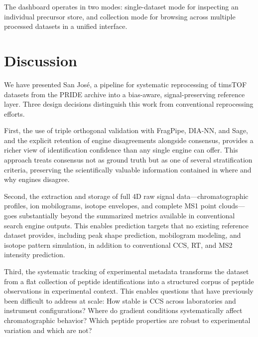 \documentclass[10pt,twoside]{article}
\begin{document}
The dashboard operates in two modes: single-dataset mode for inspecting an individual precursor store, and collection mode for browsing across multiple processed datasets in a unified interface.


\section{Discussion}

We have presented San Jos\'{e}, a pipeline for systematic reprocessing of timsTOF datasets from the PRIDE archive into a bias-aware, signal-preserving reference layer.
Three design decisions distinguish this work from conventional reprocessing efforts.

First, the use of triple orthogonal validation with FragPipe, DIA-NN, and Sage, and the explicit retention of engine disagreements alongside consensus, provides a richer view of identification confidence than any single engine can offer.
This approach treats consensus not as ground truth but as one of several stratification criteria, preserving the scientifically valuable information contained in where and why engines disagree.

Second, the extraction and storage of full 4D raw signal data---chromatographic profiles, ion mobilograms, isotope envelopes, and complete MS1 point clouds---goes substantially beyond the summarized metrics available in conventional search engine outputs.
This enables prediction targets that no existing reference dataset provides, including peak shape prediction, mobilogram modeling, and isotope pattern simulation, in addition to conventional CCS, RT, and MS2 intensity prediction.

Third, the systematic tracking of experimental metadata transforms the dataset from a flat collection of peptide identifications into a structured corpus of peptide observations in experimental context.
This enables questions that have previously been difficult to address at scale: How stable is CCS across laboratories and instrument configurations? Where do gradient conditions systematically affect chromatographic behavior? Which peptide properties are robust to experimental variation and which are not?

\end{document}
